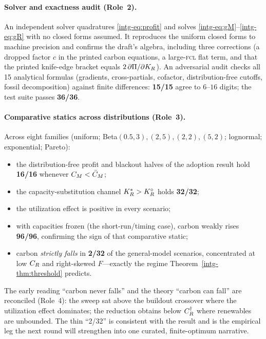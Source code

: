 \paragraph{Solver and exactness audit (Role~2).} An independent solver quadratures
\eqref{intg-eq:profit} and solves \eqref{intg-eq:gM}--\eqref{intg-eq:gR} with no closed forms
assumed. It reproduces the uniform closed forms to machine precision and confirms
the draft's algebra, including three corrections (a dropped factor $c$ in the
printed carbon equations, a large-\textsc{fcl} flat term, and that the printed
knife-edge bracket equals $2\,\partial\Pi/\partial K_R$). An adversarial audit
checks all 15 analytical formulas (gradients, cross-partials, cofactor,
distribution-free cutoffs, fossil decomposition) against finite differences:
\textbf{15/15} agree to $6$--$16$ digits; the test suite passes \textbf{36/36}.

\paragraph{Comparative statics across distributions (Role~3).} Across eight
families (uniform; Beta$(0.5,3),(2,5),(2,2),(5,2)$; lognormal; exponential;
Pareto):
\begin{itemize}[leftmargin=1.5em,topsep=2pt,itemsep=1pt]
  \item the distribution-free profit and blackout halves of the adoption result
        hold \textbf{16/16} whenever $C_M<\bar C_M$;
  \item the capacity-substitution channel $K_R^{*}>K_R^{\circ}$ holds \textbf{32/32};
  \item the utilization effect is positive in every scenario;
  \item with capacities frozen (the short-run/timing case), carbon weakly rises
        \textbf{96/96}, confirming the sign of that comparative static;
  \item carbon \emph{strictly falls} in \textbf{2/32} of the general-model
        scenarios, concentrated at low $C_R$ and right-skewed $F$---exactly the
        regime Theorem~\ref{intg-thm:threshold} predicts.
\end{itemize}
The early reading ``carbon never falls'' and the theory ``carbon can fall'' are
reconciled (Role~4): the sweep sat above the buildout crossover where the
utilization effect dominates; the reduction obtains below $C_R^{\dagger}$ where
renewables are unbounded. The thin ``2/32'' is consistent with the result and is
the empirical leg the next round will strengthen into one curated, finite-optimum
narrative.

